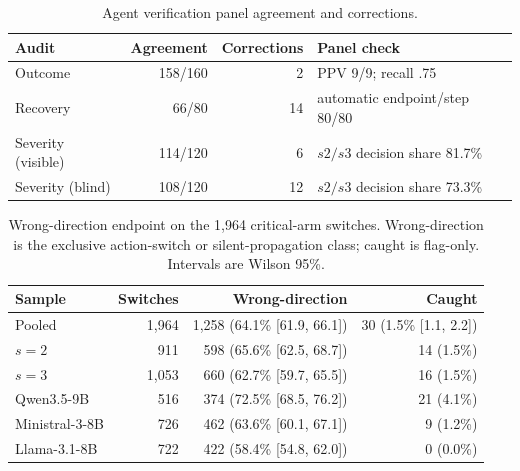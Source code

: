 \documentclass[a4paper,fleqn]{cas-sc}
\begin{document}
\begin{table}[pos=htbp]
  \centering
  \caption{Agent verification panel agreement and corrections.}
  \label{tab:panel}
  \small
  \begin{tabular}{lrrl}
    \toprule
    \textbf{Audit} & \textbf{Agreement} & \textbf{Corrections} & \textbf{Panel check} \\
    \midrule
    Outcome            & 158/160 & 2  & PPV 9/9; recall .75 \\
    Recovery           & 66/80   & 14 & automatic endpoint/step 80/80 \\
    Severity (visible) & 114/120 & 6  & $s2/s3$ decision share 81.7\% \\
    Severity (blind)   & 108/120 & 12 & $s2/s3$ decision share 73.3\% \\
    \bottomrule
  \end{tabular}
\end{table}

\begin{table}[pos=htbp]
  \centering
  \caption{Wrong-direction endpoint on the 1{,}964 critical-arm switches. Wrong-direction is
  the exclusive action-switch or silent-propagation class; caught is flag-only. Intervals are
  Wilson 95\%.}
  \label{tab:wrongdir}
  \small
  \begin{tabular}{lrrr}
    \toprule
    \textbf{Sample} & \textbf{Switches} & \textbf{Wrong-direction} & \textbf{Caught} \\
    \midrule
    Pooled       & 1{,}964 & 1{,}258 (64.1\% [61.9, 66.1]) & 30 (1.5\% [1.1, 2.2]) \\
    $s=2$        & 911     & 598 (65.6\% [62.5, 68.7])     & 14 (1.5\%) \\
    $s=3$        & 1{,}053 & 660 (62.7\% [59.7, 65.5])     & 16 (1.5\%) \\
    Qwen3.5-9B     & 516   & 374 (72.5\% [68.5, 76.2])     & 21 (4.1\%) \\
    Ministral-3-8B & 726   & 462 (63.6\% [60.1, 67.1])     & 9 (1.2\%) \\
    Llama-3.1-8B   & 722   & 422 (58.4\% [54.8, 62.0])     & 0 (0.0\%) \\
    \bottomrule
  \end{tabular}
\end{table}
\end{document}

